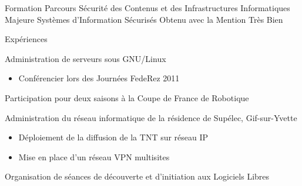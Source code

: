 \begin{resume}

\supspacer


\begin{supitemize}{Formation}
		{Parcours Sécurité des Contenus et des Infrastructures Informatiques}
		{Majeure Systèmes d'Information Sécurisés}
		{}
		{Obtenu avec la Mention Très Bien}
\end{supitemize}

\begin{supitemize}{Expériences}
		{}
		{
			Administration de serveurs sous GNU/Linux
			\begin{itemize}
				\item Conférencier lors des Journées FedeRez 2011
			\end{itemize}
		}
		{}
		{}
		{Participation pour deux saisons à la Coupe de France de Robotique}
		{
			Administration du réseau informatique de la résidence de Supélec, Gif-sur-Yvette
			\begin{itemize}
				\item Déploiement de la diffusion de la TNT sur réseau IP
				\item Mise en place d'un réseau VPN multisites
			\end{itemize}
		}
		{Organisation de séances de découverte et d'initiation aux Logiciels Libres}
\end{supitemize}


\end{resume}
